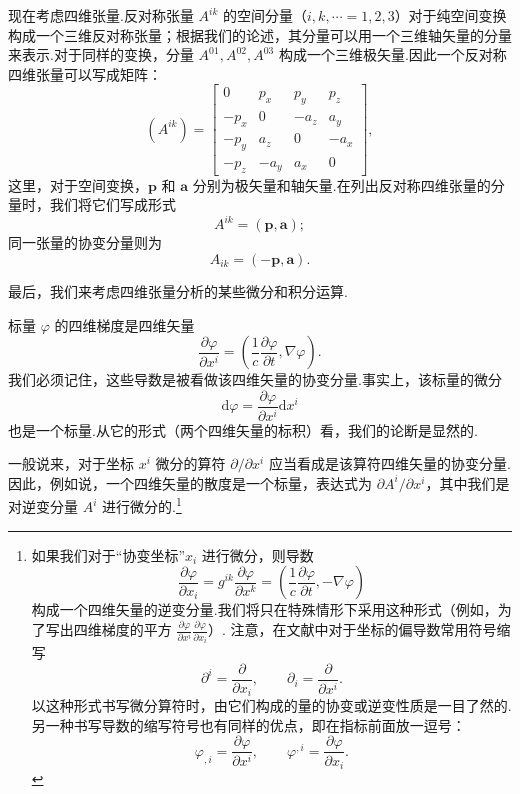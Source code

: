 现在考虑四维张量.反对称张量 $A^{ik}$ 的空间分量（$i,k,\cdots=1,2,3$）对于纯空间变换构成一个三维反对称张量；根据我们的论述，其分量可以用一个三维轴矢量的分量来表示.对于同样的变换，分量 $A^{01},A^{02},A^{03}$ 构成一个三维极矢量.因此一个反对称四维张量可以写成矩阵：
\begin{equation}
  (A^{ik})=\begin{bmatrix}
    0 & p_x & p_y & p_z\\
    -p_x & 0 & -a_z & a_y\\
    -p_y & a_z & 0 & -a_x\\
    -p_z & -a_y & a_x & 0
  \end{bmatrix},
\end{equation}
这里，对于空间变换，$\boldsymbol{p}$ 和 $\boldsymbol{a}$ 分别为极矢量和轴矢量.在列出反对称四维张量的分量时，我们将它们写成形式
\begin{equation*}
  A^{ik}=(\boldsymbol{p},\boldsymbol{a});
\end{equation*}
同一张量的协变分量则为
\begin{equation*}
  A_{ik}=(-\boldsymbol{p},\boldsymbol{a}).
\end{equation*}

最后，我们来考虑四维张量分析的某些微分和积分运算.

标量 $\varphi$ 的四维梯度是四维矢量
\begin{equation*}
  \frac{\partial\varphi}{\partial x^i}
  =\left(\frac{1}{c}\frac{\partial\varphi}{\partial t},\nabla\varphi\right).
\end{equation*}
我们必须记住，这些导数是被看做该四维矢量的协变分量.事实上，该标量的微分
\begin{equation*}
  \mathrm{d}\varphi=\frac{\partial\varphi}{\partial x^i}\mathrm{d}x^i
\end{equation*}
也是一个标量.从它的形式（两个四维矢量的标积）看，我们的论断是显然的.

一般说来，对于坐标 $x^i$ 微分的算符 $\partial/\partial x^i$ 应当看成是该算符四维矢量的协变分量.因此，例如说，一个四维矢量的散度是一个标量，表达式为 $\partial A^i/\partial x^i$，其中我们是对逆变分量 $A^i$ 进行微分的.\footnote{如果我们对于“协变坐标”$x_i$ 进行微分，则导数
\begin{equation*}
  \frac{\partial\varphi}{\partial x_i}=g^{ik}\frac{\partial\varphi}{\partial x^k}
  =\left(\frac{1}{c}\frac{\partial\varphi}{\partial t},-\nabla\varphi\right)
\end{equation*}
构成一个四维矢量的逆变分量.我们将只在特殊情形下采用这种形式（例如，为了写出四维梯度的平方 $\frac{\partial\varphi}{\partial x^i}\frac{\partial\varphi}{\partial x_i}$）.
注意，在文献中对于坐标的偏导数常用符号缩写
\begin{equation*}
  \partial^i=\frac{\partial}{\partial x_i},\qquad
  \partial_i=\frac{\partial}{\partial x^i}.
\end{equation*}
以这种形式书写微分算符时，由它们构成的量的协变或逆变性质是一目了然的.另一种书写导数的缩写符号也有同样的优点，即在指标前面放一逗号：
\begin{equation*}
  \varphi_{,i}=\frac{\partial\varphi}{\partial x^i},\qquad
  \varphi^{,i}=\frac{\partial\varphi}{\partial x_i}.
\end{equation*}}

